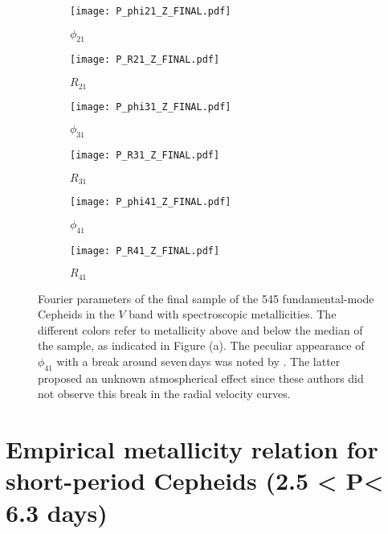 \documentclass[article]{aa} %
\begin{document}
\begin{figure*} %
\begin{subfigure}{0.50\textwidth}
\texttt{[image: P\_phi21\_Z\_FINAL.pdf]}
\caption{$\phi_{21}$} \label{fig:phi21}
\end{subfigure}\hspace*{\fill}
\begin{subfigure}{0.50\textwidth}
\texttt{[image: P\_R21\_Z\_FINAL.pdf]}
\caption{$R_{21}$} \label{fig:R21}
\end{subfigure}

\medskip
\begin{subfigure}{0.50\textwidth}
\texttt{[image: P\_phi31\_Z\_FINAL.pdf]}
\caption{$\phi_{31}$} \label{fig:phi31}
\end{subfigure}\hspace*{\fill}
\begin{subfigure}{0.50\textwidth}
\texttt{[image: P\_R31\_Z\_FINAL.pdf]}
\caption{$R_{31}$} \label{fig:R31}
\end{subfigure}

\medskip
\begin{subfigure}{0.50\textwidth}
\texttt{[image: P\_phi41\_Z\_FINAL.pdf]}
\caption{$\phi_{41}$} \label{fig:phi41}
\end{subfigure}\hspace*{\fill}
\begin{subfigure}{0.50\textwidth}
\texttt{[image: P\_R41\_Z\_FINAL.pdf]}
\caption{$R_{41}$} \label{fig:R41}
\end{subfigure}
\caption{Fourier parameters of the final sample of the 545 fundamental-mode Cepheids in  the $V$ band with spectroscopic metallicities. The different colors refer to metallicity above and below the median of the sample, as indicated in Figure (a). The peculiar appearance of $\phi_{41}$ with a break around seven$\,$days was noted by \cite{SimonMoffett1985,kovacs90}. The latter proposed an unknown atmospherical effect since these authors did not observe this break in the radial velocity curves. }\label{fig:fourier}
\end{figure*}


\section{Empirical metallicity relation for short-period Cepheids (2.5 < P< 6.3 days) \label{sect:Z_short}}
\end{document}
